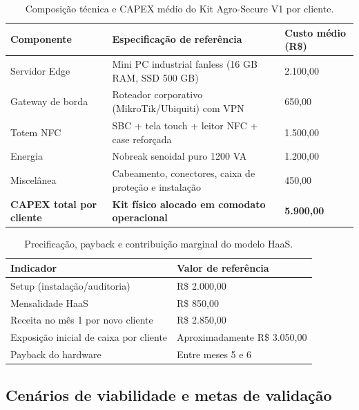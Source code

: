 \begin{table}[htb]
\centering
\caption{Composição técnica e CAPEX médio do Kit Agro-Secure V1 por cliente.}
\label{tab:kit-capex-v1}
\begin{tabular}{|p{}|p{}|p{}|}
\hline
\textbf{Componente} & \textbf{Especificação de referência} & \textbf{Custo médio (R\$)} \\
\hline
Servidor Edge & Mini PC industrial fanless (16 GB RAM, SSD 500 GB) & 2.100,00 \\
\hline
Gateway de borda & Roteador corporativo (MikroTik/Ubiquiti) com VPN & 650,00 \\
\hline
Totem NFC & SBC + tela touch + leitor NFC + case reforçada & 1.500,00 \\
\hline
Energia & Nobreak senoidal puro 1200 VA & 1.200,00 \\
\hline
Miscelânea & Cabeamento, conectores, caixa de proteção e instalação & 450,00 \\
\hline
\textbf{CAPEX total por cliente} & \textbf{Kit físico alocado em comodato operacional} & \textbf{5.900,00} \\
\hline
\end{tabular}
\end{table}

\begin{table}[htb]
\centering
\caption{Precificação, payback e contribuição marginal do modelo HaaS.}
\label{tab:precificacao-payback}
\begin{tabular}{|p{}|p{}|}
\hline
\textbf{Indicador} & \textbf{Valor de referência} \\
\hline
Setup (instalação/auditoria) & R\$ 2.000,00 \\
\hline
Mensalidade HaaS & R\$ 850,00 \\
\hline
Receita no mês 1 por novo cliente & R\$ 2.850,00 \\
\hline
Exposição inicial de caixa por cliente & Aproximadamente R\$ 3.050,00 \\
\hline
Payback do hardware & Entre meses 5 e 6 \\
\hline
\end{tabular}
\end{table}

\subsection{Cenários de viabilidade e metas de validação}

